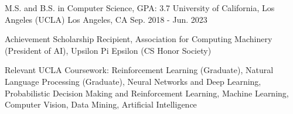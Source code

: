 

\begin{cventries}

  \cventry
    {M.S. and B.S. in Computer Science, GPA: 3.7} %
    {University of California, Los Angeles (UCLA)} %
    {Los Angeles, CA} %
    {Sep. 2018 - Jun. 2023} %
    {
      \begin{cvitems} %
        \item {Achievement Scholarship Recipient, Association for Computing Machinery
        (President of AI), Upsilon Pi Epsilon (CS Honor Society)}
        \item {Relevant UCLA Coursework: Reinforcement Learning (Graduate), Natural Language Processing (Graduate),
        Neural Networks and Deep Learning, Probabilistic Decision Making and Reinforcement 
        Learning, Machine Learning, Computer Vision, Data Mining, Artificial Intelligence}
      \end{cvitems}
    }

\end{cventries}
